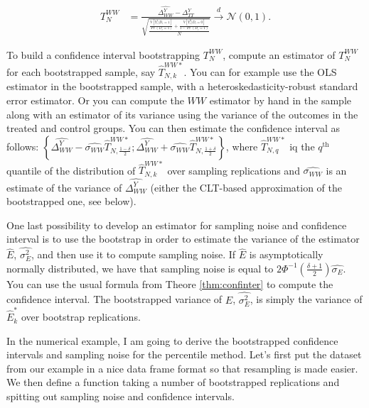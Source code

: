 \documentclass[]{book}
\newcommand{\var}[1]{\mathbb{V}[ #1 ]}
\theoremstyle{definition}
\theoremstyle{definition}
\theoremstyle{definition}
\theoremstyle{remark}
\let\BeginKnitrBlock\begin \let\EndKnitrBlock\end
\begin{document}
\begin{align*}
  T_N^{WW} & = \frac{\hat{\Delta^Y_{WW}}-\Delta^Y_{TT}}{\sqrt{\frac{\frac{\var{Y_i^1|D_i=1}}{\Pr(D_i=1)}+\frac{\var{Y_i^0|D_i=0}}{1-\Pr(D_i=1)}}{N}}} \stackrel{d}{\rightarrow}\mathcal{N}\left(0,1\right).
\end{align*}

To build a confidence interval bootstrapping \(T_N^{WW}\), compute an estimator of \(T_N^{WW}\) for each bootstrapped sample, say \(\hat{T}_{N,k}^{WW*}\).
You can for example use the OLS estimator in the bootstrapped sample, with a heteroskedasticity-robust standard error estimator.
Or you can compute the \(WW\) estimator by hand in the sample along with an estimator of its variance using the variance of the outcomes in the treated and control groups.
You can then estimate the confidence interval as follows: \(\left\{\hat{\Delta^Y_{WW}}-\hat{\sigma_{WW}}\hat{T}^{WW*}_{N,\frac{1-\delta}{2}};\hat{\Delta^Y_{WW}}+\hat{\sigma_{WW}}\hat{T}^{WW*}_{N,\frac{1+\delta}{2}}\right\}\), where \(\hat{T}^{WW*}_{N,q}\) iq the \(q^{\text{th}}\) quantile of the distribution of \(\hat{T}_{N,k}^{WW*}\) over sampling replications and \(\hat{\sigma_{WW}}\) is an estimate of the variance of \(\hat{\Delta^Y_{WW}}\) (either the CLT-based approximation of the bootstrapped one, see below).

\BeginKnitrBlock{remark}
\iffalse{} {Remark. } \fi{}One last possibility to develop an estimator for sampling noise and confidence interval is to use the bootstrap in order to estimate the variance of the estimator \(\hat{E}\), \(\hat{\sigma^2_{E}}\), and then use it to compute sampling noise.
If \(\hat{E}\) is asymptotically normally distributed, we have that sampling noise is equal to \(2\Phi^{-1}\left(\frac{\delta+1}{2}\right)\hat{\sigma_{E}}\).
You can use the usual formula from Theore \ref{thm:confinter} to compute the confidence interval.
The bootstrapped variance of \(\hat{E}\), \(\hat{\sigma^2_{E}}\), is simply the variance of \(\hat{E}^*_k\) over bootstrap replications.
\EndKnitrBlock{remark}

\BeginKnitrBlock{example}
\protect\hypertarget{exm:unnamed-chunk-59}{}{\label{exm:unnamed-chunk-59} }In the numerical example, I am going to derive the bootstrapped confidence intervals and sampling noise for the percentile method.
Let's first put the dataset from our example in a nice data frame format so that resampling is made easier.
We then define a function taking a number of bootstrapped replications and spitting out sampling noise and confidence intervals.
\EndKnitrBlock{example}
\end{document}
